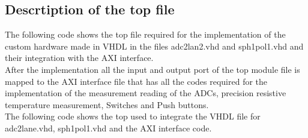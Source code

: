 \subsection{Descrtiption of the top file}
The following code shows the top file required for the implementation of the custom hardware made in VHDL in the files adc2lan2.vhd and sph1pol1.vhd and their integration with the AXI interface. \\
After the implementation all the input and output port of the top module file is mapped to the AXI interface file that has all the codes required for the implementation of the measurement reading of the ADCs, precision resistive temperature measurement, Switches and Push buttons. \\
The following code shows the top used to integrate the VHDL file for adc2lane.vhd, sph1pol1.vhd and the AXI interface code. \\
